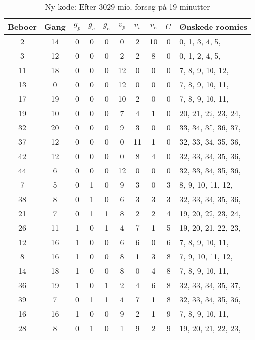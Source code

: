 \documentclass[article,oneside,11pt,a4paper]{memoir}
\newenvironment{assignment}[1]{
\begin{table}[h]
\caption{#1}
\footnotesize
\begin{center}
\begin{tabular}{cccccccccl}
\toprule
Beboer & Gang & $g_p$ & $g_s$ & $g_e$ & $v_p$ & $v_s$ & $v_e$ & $G$ & Ønskede roomies \\ \midrule
}{
\bottomrule
\end{tabular}
\end{center}
\end{table}

}
\begin{document}
\begin{assignment}{Ny kode: Efter 3029 mio. forsøg på 19 minutter}
     2 &   14 &   0 &   0 &   0 &   0 &   2 &  10 &  0 &   0,  1,  3,  4,  5, \\
     3 &   12 &   0 &   0 &   0 &   2 &   2 &   8 &  0 &   0,  1,  2,  4,  5, \\
    11 &   18 &   0 &   0 &   0 &  12 &   0 &   0 &  0 &   7,  8,  9, 10, 12, \\
    13 &    0 &   0 &   0 &   0 &  12 &   0 &   0 &  0 &   7,  8,  9, 10, 11, \\
    17 &   19 &   0 &   0 &   0 &  10 &   2 &   0 &  0 &   7,  8,  9, 10, 11, \\
    19 &   10 &   0 &   0 &   0 &   7 &   4 &   1 &  0 &  20, 21, 22, 23, 24, \\
    32 &   20 &   0 &   0 &   0 &   9 &   3 &   0 &  0 &  33, 34, 35, 36, 37, \\
    37 &   12 &   0 &   0 &   0 &   0 &  11 &   1 &  0 &  32, 33, 34, 35, 36, \\
    42 &   12 &   0 &   0 &   0 &   0 &   8 &   4 &  0 &  32, 33, 34, 35, 36, \\
    44 &    6 &   0 &   0 &   0 &  12 &   0 &   0 &  0 &  32, 33, 34, 35, 36, \\
     7 &    5 &   0 &   1 &   0 &   9 &   3 &   0 &  3 &   8,  9, 10, 11, 12, \\
    38 &    8 &   0 &   1 &   0 &   6 &   3 &   3 &  3 &  32, 33, 34, 35, 36, \\
    21 &    7 &   0 &   1 &   1 &   8 &   2 &   2 &  4 &  19, 20, 22, 23, 24, \\
    26 &   11 &   1 &   0 &   1 &   4 &   7 &   1 &  5 &  19, 20, 21, 22, 23, \\
    12 &   16 &   1 &   0 &   0 &   6 &   6 &   0 &  6 &   7,  8,  9, 10, 11, \\
     8 &   16 &   1 &   0 &   0 &   8 &   1 &   3 &  8 &   7,  9, 10, 11, 12, \\
    14 &   18 &   1 &   0 &   0 &   8 &   0 &   4 &  8 &   7,  8,  9, 10, 11, \\
    36 &   19 &   1 &   0 &   1 &   2 &   4 &   6 &  8 &  32, 33, 34, 35, 37, \\
    39 &    7 &   0 &   1 &   1 &   4 &   7 &   1 &  8 &  32, 33, 34, 35, 36, \\
    16 &   16 &   1 &   0 &   0 &   9 &   2 &   1 &  9 &   7,  8,  9, 10, 11, \\
    28 &    8 &   0 &   1 &   0 &   1 &   9 &   2 &  9 &  19, 20, 21, 22, 23, \\

\end{assignment}
\end{document}
